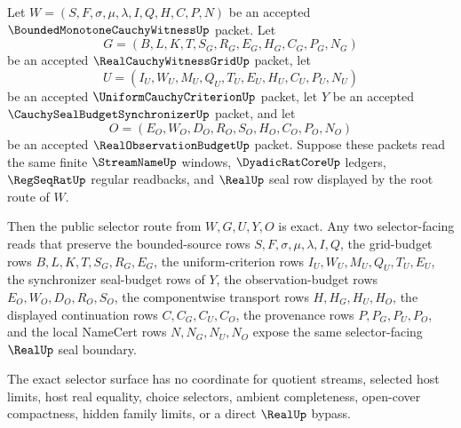 \begin{theorem}
\label{thm:bounded-monotone-cauchy-witness-grid-selector-exactness}
Let $W=(S,F,\sigma,\mu,\lambda,I,Q,H,C,P,N)$ be an accepted $\BoundedMonotoneCauchyWitnessUp$ packet. Let
$$
G=(B,L,K,T,S_G,R_G,E_G,H_G,C_G,P_G,N_G)
$$
be an accepted $\RealCauchyWitnessGridUp$ packet, let
$$
U=(I_U,W_U,M_U,Q_U,T_U,E_U,H_U,C_U,P_U,N_U)
$$
be an accepted $\UniformCauchyCriterionUp$ packet, let $Y$ be an accepted $\CauchySealBudgetSynchronizerUp$ packet, and let
$$
O=(E_O,W_O,D_O,R_O,S_O,H_O,C_O,P_O,N_O)
$$
be an accepted $\RealObservationBudgetUp$ packet. Suppose these packets read the same finite $\StreamNameUp$ windows, $\DyadicRatCoreUp$ ledgers, $\RegSeqRatUp$ regular readbacks, and $\RealUp$ seal row displayed by the root route of $W$.

Then the public selector route from $W,G,U,Y,O$ is exact. Any two selector-facing reads that preserve the bounded-source rows $S,F,\sigma,\mu,\lambda,I,Q$, the grid-budget rows $B,L,K,T,S_G,R_G,E_G$, the uniform-criterion rows $I_U,W_U,M_U,Q_U,T_U,E_U$, the synchronizer seal-budget rows of $Y$, the observation-budget rows $E_O,W_O,D_O,R_O,S_O$, the componentwise transport rows $H,H_G,H_U,H_O$, the displayed continuation rows $C,C_G,C_U,C_O$, the provenance rows $P,P_G,P_U,P_O$, and the local NameCert rows $N,N_G,N_U,N_O$ expose the same selector-facing $\RealUp$ seal boundary.

The exact selector surface has no coordinate for quotient streams, selected host limits, host real equality, choice selectors, ambient completeness, open-cover compactness, hidden family limits, or a direct $\RealUp$ bypass.
\end{theorem}
